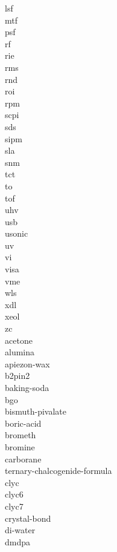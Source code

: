\documentclass[../main.tex]{subfiles}%
\begin{document}
\gls{lsf}\\%
\gls{mtf}\\%
\gls{psf}\\%
\gls{rf}\\%
\gls{rie}\\%
\gls{rms}\\%
\gls{rnd}\\%
\gls{roi}\\%
\gls{rpm}\\%
\gls{scpi}\\%
\gls{sds}\\%
\gls{sipm}\\%
\gls{sla}\\%
\gls{snm}\\%
\gls{tct}\\%
\gls{to}\\%
\gls{tof}\\%
\gls{uhv}\\%
\gls{usb}\\%
\gls{usonic}\\%
\gls{uv}\\%
\gls{vi}\\%
\gls{visa}\\%
\gls{vme}\\%
\gls{wls}\\%
\gls{xdl}\\%
\gls{xeol}\\%
\gls{zc}\\%
\gls{acetone}\\%
\gls{alumina}\\%
\gls{apiezon-wax}\\%
\gls{b2pin2}\\%
\gls{baking-soda}\\%
\gls{bgo}\\%
\gls{bismuth-pivalate}\\%
\gls{boric-acid}\\%
\gls{brometh}\\%
\gls{bromine}\\%
\gls{carborane}\\%
\gls{ternary-chalcogenide-formula}\\%
\gls{clyc}\\%
\gls{clyc6}\\%
\gls{clyc7}\\%
\gls{crystal-bond}\\%
\gls{di-water}\\%
\gls{dmdpa}\\%
\end{document}

